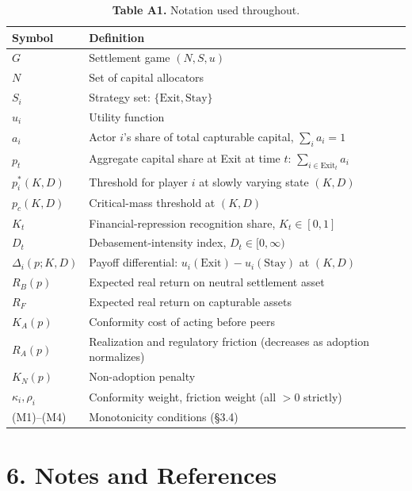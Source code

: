 \documentclass[12pt]{article}
\theoremstyle{definition}
\theoremstyle{remark}
\begin{document}
\begin{table}[h]
\centering
\caption*{\textbf{Table A1.} Notation used throughout.}
\begin{tabularx}{\textwidth}{lX}
\toprule
Symbol & Definition \\
\midrule
$G$ & Settlement game $(N, S, u)$ \\
$N$ & Set of capital allocators \\
$S_i$ & Strategy set: $\{\text{Exit}, \text{Stay}\}$ \\
$u_i$ & Utility function \\
$a_i$ & Actor $i$'s share of total capturable capital, $\sum_i a_i = 1$ \\
$p_t$ & Aggregate capital share at Exit at time $t$: $\sum_{i \in \text{Exit}_t} a_i$ \\
$p_i^*(K, D)$ & Threshold for player $i$ at slowly varying state $(K, D)$ \\
$p_c(K, D)$ & Critical-mass threshold at $(K, D)$ \\
$K_t$ & Financial-repression recognition share, $K_t \in [0, 1]$ \\
$D_t$ & Debasement-intensity index, $D_t \in [0, \infty)$ \\
$\Delta_i(p; K, D)$ & Payoff differential: $u_i(\text{Exit}) - u_i(\text{Stay})$ at $(K, D)$ \\
$R_B(p)$ & Expected real return on neutral settlement asset \\
$R_F$ & Expected real return on capturable assets \\
$K_A(p)$ & Conformity cost of acting before peers \\
$R_A(p)$ & Realization and regulatory friction (decreases as adoption normalizes) \\
$K_N(p)$ & Non-adoption penalty \\
$\kappa_i, \rho_i$ & Conformity weight, friction weight (all $> 0$ strictly) \\
(M1)--(M4) & Monotonicity conditions (\S3.4) \\
\bottomrule
\end{tabularx}
\end{table}



\clearpage
\section{6. Notes and References}
\end{document}
